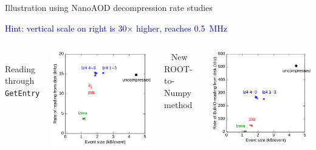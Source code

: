 \documentclass[aspectratio=169]{beamer}
\begin{document}
\begin{frame}{Illustration using NanoAOD decompression rate studies}
\begin{center}
\textcolor{darkblue}{\large Hint: vertical scale on right is 30$\times$ higher, reaches 0.5~MHz}
\end{center}

\begin{columns}
\mbox{ } \hfill Reading through {\tt GetEntry} \hfill \mbox{ }

\includegraphics[width=\linewidth]{read.png}

\mbox{ } \hfill New ROOT-to-Numpy method \hfill \mbox{ }

\includegraphics[width=\linewidth]{bulk.png}

\end{columns}
\end{frame}
\end{document}
